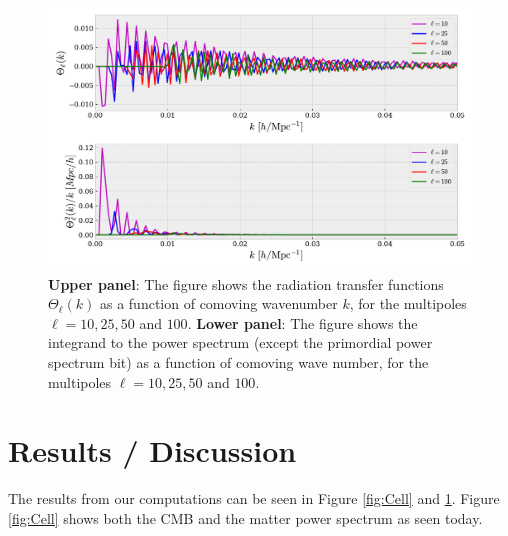 \documentclass[twocolumn]{aastex62}
\begin{document}
\begin{figure}
    \includegraphics[scale = 0.65]{Figures/Transfer_func.pdf}
    \caption{\textbf{Upper panel}: The figure shows the radiation transfer functions $\Theta_\ell(k)$ as a function of comoving wavenumber $k$, for the multipoles $\ell = 10, 25, 50$ and $100$. \textbf{Lower panel}: The figure shows the integrand to the power spectrum (except the primordial power spectrum bit) as a function of comoving wave number, for the multipoles $\ell = 10, 25, 50$ and $100$.}
    \label{fig:Transfer_func}
\end{figure}

\section{Results / Discussion}\label{sec:Results/Discussion}
The results from our computations can be seen in Figure \ref{fig:Cell} and \ref{fig:Transfer_func}. Figure \ref{fig:Cell} shows both the CMB and the matter power spectrum as seen today. 
\end{document}
